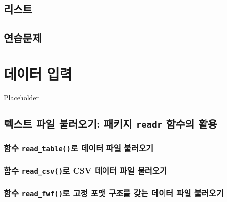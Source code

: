 \documentclass[
]{book}
\begin{document}
\hypertarget{section-list}{%
\section{리스트}\label{section-list}}

\hypertarget{uxc5f0uxc2b5uxbb38uxc81c}{%
\section{연습문제}\label{uxc5f0uxc2b5uxbb38uxc81c}}

\hypertarget{uxb370uxc774uxd130-uxc785uxb825}{%
\chapter{데이터 입력}\label{uxb370uxc774uxd130-uxc785uxb825}}

Placeholder

\hypertarget{uxd14duxc2a4uxd2b8-uxd30cuxc77c-uxbd88uxb7ecuxc624uxae30-uxd328uxd0a4uxc9c0-readr-uxd568uxc218uxc758-uxd65cuxc6a9}{%
\section{\texorpdfstring{텍스트 파일 불러오기: 패키지 \texttt{readr} 함수의 활용}{텍스트 파일 불러오기: 패키지 readr 함수의 활용}}\label{uxd14duxc2a4uxd2b8-uxd30cuxc77c-uxbd88uxb7ecuxc624uxae30-uxd328uxd0a4uxc9c0-readr-uxd568uxc218uxc758-uxd65cuxc6a9}}

\hypertarget{uxd568uxc218-read_tableuxb85c-uxb370uxc774uxd130-uxd30cuxc77c-uxbd88uxb7ecuxc624uxae30}{%
\subsection{\texorpdfstring{함수 \texttt{read\_table()}로 데이터 파일 불러오기}{함수 read\_table()로 데이터 파일 불러오기}}\label{uxd568uxc218-read_tableuxb85c-uxb370uxc774uxd130-uxd30cuxc77c-uxbd88uxb7ecuxc624uxae30}}

\hypertarget{uxd568uxc218-read_csvuxb85c-csv-uxb370uxc774uxd130-uxd30cuxc77c-uxbd88uxb7ecuxc624uxae30}{%
\subsection{\texorpdfstring{함수 \texttt{read\_csv()}로 CSV 데이터 파일 불러오기}{함수 read\_csv()로 CSV 데이터 파일 불러오기}}\label{uxd568uxc218-read_csvuxb85c-csv-uxb370uxc774uxd130-uxd30cuxc77c-uxbd88uxb7ecuxc624uxae30}}

\hypertarget{uxd568uxc218-read_fwfuxb85c-uxace0uxc815-uxd3ecuxb9f7-uxad6cuxc870uxb97c-uxac16uxb294-uxb370uxc774uxd130-uxd30cuxc77c-uxbd88uxb7ecuxc624uxae30}{%
\subsection{\texorpdfstring{함수 \texttt{read\_fwf()}로 고정 포맷 구조를 갖는 데이터 파일 불러오기}{함수 read\_fwf()로 고정 포맷 구조를 갖는 데이터 파일 불러오기}}\label{uxd568uxc218-read_fwfuxb85c-uxace0uxc815-uxd3ecuxb9f7-uxad6cuxc870uxb97c-uxac16uxb294-uxb370uxc774uxd130-uxd30cuxc77c-uxbd88uxb7ecuxc624uxae30}}
\end{document}

